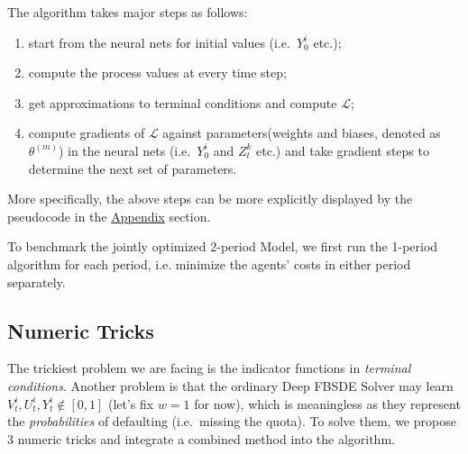 \documentclass[a4paper,10pt]{article}
\newcommand{\1}{\mathbf{1}}
\begin{document}
The algorithm takes major steps as follows:

\begin{enumerate}
    \item
      start from the neural nets for initial values (i.e.~\(Y_0^i\) etc.);
    \item
      compute the process values at every time step;
    \item
      get approximations to terminal conditions and compute \(\mathcal{L}\);
    \item
      compute gradients of \(\mathcal{L}\) against parameters(weights and
      biases, denoted as \(\theta^{(m)}\)) in the neural nets
      (i.e.~\(Y_0^i\) and \(Z_t^k\) etc.) and take gradient steps to
      determine the next set of parameters.
\end{enumerate}

More specifically, the above steps can be more explicitly displayed by the pseudocode in the \hyperlink{Algorithms}{Appendix} section.

To benchmark the jointly optimized 2-period Model, we first run the 1-period algorithm for each period, i.e. minimize the agents' costs in either period separately. 



\subsection{Numeric Tricks}\label{numeric-tricks}

The trickiest problem we are facing is the indicator functions in
\emph{terminal conditions}. Another problem is that the ordinary Deep FBSDE Solver may learn \(V_t^i,U_t^i,Y_t^i \notin [0,1]\) (let's fix \(w=1\) for now), which is meaningless as they represent the \emph{probabilities} of defaulting (i.e.~missing the quota). To solve them, we propose 3 numeric tricks and integrate a combined method into the algorithm.
\end{document}
